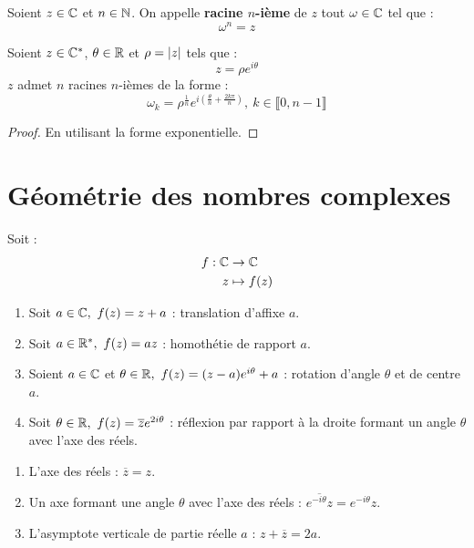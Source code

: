 \begin{definition}
	Soient $z \in \mathbb{C}$ et $n \in \mathbb{N}$. On appelle \textbf{racine $n$-ième} de $z$ tout $\omega \in \mathbb{C}$ tel que :
	\[ \omega^n = z \] 
\end{definition}

\begin{proposition}
	Soient $z \in \mathbb{C}^*$, $\theta \in \mathbb{R}$ et $\rho = \abs{z}$ tels que :
	\[ z = \rho e^{i\theta} \]
	$z$ admet $n$ racines $n$-ièmes de la forme :
	\[ \omega_k = \rho^{\frac{1}{n}} e^{i \left( \frac{\theta}{n} + \frac{2 k \pi}{n} \right)},\ k \in \llbracket 0, n - 1 \rrbracket \]
\end{proposition}

\begin{proof}
	En utilisant la forme exponentielle.
\end{proof}

\section{Géométrie des nombres complexes}
\begin{proposition}
	Soit :
	\begin{align*}
		f : \mathbb{C} &\to \mathbb{C} \\ 
		z &\mapsto f(z)
	\end{align*}
	\begin{enumerate}
		\item Soit $a \in \mathbb{C},\ f(z) = z + a$ : translation d'affixe $a$.
		\item Soit $a \in \mathbb{R}^*,\ f(z) = az$ : homothétie de rapport $a$.
		\item Soient $a \in \mathbb{C}$ et $\theta \in \mathbb{R},\ f(z) = (z-a)e^{i\theta} + a$ : rotation d'angle $\theta$ et de centre $a$.
		\item Soit $\theta \in \mathbb{R},\ f(z) = \overline{z} e^{2i\theta}$ : réflexion par rapport à la droite formant un angle $\theta$ avec l'axe des réels.
	\end{enumerate}
\end{proposition}

\begin{proposition}
	
	\begin{enumerate}
		\item L'axe des réels : $\overline{z} = z$.
		\item Un axe formant une angle $\theta$ avec l'axe des réels : $\overline{e^{-i \theta}z} = e^{-i \theta} z$.
		\item L'asymptote verticale de partie réelle $a$ : $z + \overline{z} = 2a$.
	\end{enumerate}
\end{proposition}